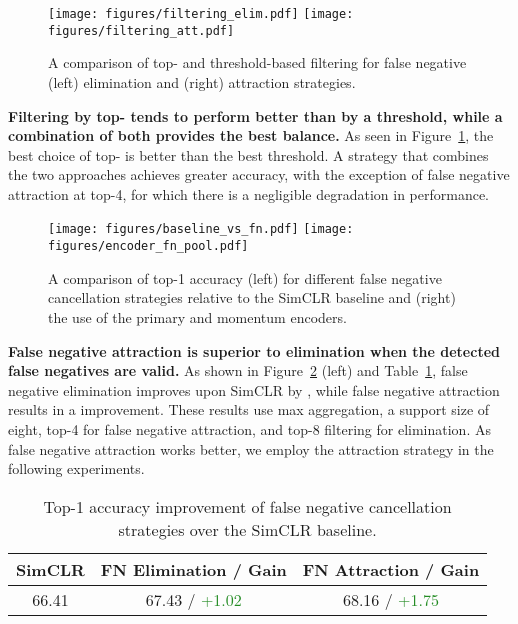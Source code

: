 \documentclass[10pt,twocolumn,letterpaper]{article}
\begin{document}
\begin{figure}[!th]
\texttt{[image: figures/filtering\_elim.pdf]}\hfil
    \texttt{[image: figures/filtering\_att.pdf]}
    \caption{A comparison of top- and threshold-based filtering for false negative (left) elimination and (right) attraction strategies.} \label{fig:filtering}
\end{figure}
\textbf{Filtering by top- tends to perform better than by a threshold, while a combination of both provides the best balance.} As seen in Figure~\ref{fig:filtering}, the best choice of top- is better than the best threshold. A strategy that combines the two approaches achieves greater accuracy, with the exception of false negative attraction at top-4, for which there is a negligible degradation in performance. 

\begin{figure}[!th]
    \texttt{[image: figures/baseline\_vs\_fn.pdf]}\hfil
    \texttt{[image: figures/encoder\_fn\_pool.pdf]}
    \caption{A comparison of top-1 accuracy (left) for different false negative cancellation strategies relative to the SimCLR baseline and (right) the use of the primary and momentum encoders.} \label{fig:baseline_vs_fn_encoder_fn_pool}
\end{figure}
\textbf{False negative attraction is superior to elimination when the detected false negatives are valid.} As shown in Figure~\ref{fig:baseline_vs_fn_encoder_fn_pool} (left) and Table~\ref{tab:fn_elim_att}, false negative elimination improves upon SimCLR by , while false negative attraction results in a  improvement. These results use max aggregation, a support size of eight, top-4 for false negative attraction, and top-8 filtering for elimination. As false negative attraction works better, we employ the attraction strategy in the following experiments.
\begin{table}
    \footnotesize
    \centering
    \begin{tabularx}{1.0\linewidth}{ccc}
    \toprule
    SimCLR & FN Elimination / Gain & FN Attraction / Gain\\
    \midrule
    66.41 & 67.43 / \textcolor{ForestGreen}{+1.02} & 68.16 / \textcolor{ForestGreen}{+1.75} \\
    \bottomrule
    \end{tabularx}
    \vspace{5pt}
    \caption{Top-1 accuracy improvement of false negative cancellation strategies over the SimCLR baseline.}
    \label{tab:fn_elim_att}
\end{table}
\end{document}
